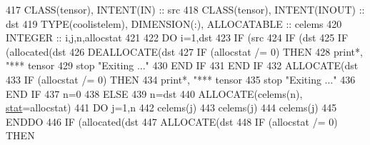 \begin{DoxyCode}
417     \textcolor{keywordtype}{CLASS}(tensor), \textcolor{keywordtype}{INTENT(IN)} :: src
418     \textcolor{keywordtype}{CLASS}(tensor), \textcolor{keywordtype}{INTENT(INOUT)} :: dst
419     \textcolor{keywordtype}{TYPE}(coolistelem), \textcolor{keywordtype}{DIMENSION(:)}, \textcolor{keywordtype}{ALLOCATABLE} :: celems
420     \textcolor{keywordtype}{INTEGER} :: i,j,n,allocstat
421 
422     \textcolor{keywordflow}{DO} i=1,dst%
423        \textcolor{keywordflow}{IF} (src%
424           \textcolor{keywordflow}{IF} (dst%
425              \textcolor{keywordflow}{IF} (\textcolor{keyword}{allocated}(dst%
426                 \textcolor{keyword}{DEALLOCATE}(dst%
427                 \textcolor{keywordflow}{IF} (allocstat /= 0) \textcolor{keywordflow}{THEN}
428                   print*, \textcolor{stringliteral}{"*** tensor%
429                   stop \textcolor{stringliteral}{"Exiting ..."}
430 \textcolor{keywordflow}{                END IF}
431 \textcolor{keywordflow}{             END IF}
432              \textcolor{keyword}{ALLOCATE}(dst%
433              \textcolor{keywordflow}{IF} (allocstat /= 0) \textcolor{keywordflow}{THEN}
434                   print*, \textcolor{stringliteral}{"*** tensor%
435                   stop \textcolor{stringliteral}{"Exiting ..."}
436 \textcolor{keywordflow}{             END IF}
437              n=0
438           \textcolor{keywordflow}{ELSE}
439              n=dst%
440              \textcolor{keyword}{ALLOCATE}(celems(n), \hyperlink{namespacestat}{stat}=allocstat)
441              \textcolor{keywordflow}{DO} j=1,n
442                 celems(j)%
443                 celems(j)%
444                 celems(j)%
445 \textcolor{keywordflow}{             ENDDO}
446              \textcolor{keywordflow}{IF} (\textcolor{keyword}{allocated}(dst%
447              \textcolor{keyword}{ALLOCATE}(dst%
448              \textcolor{keywordflow}{IF} (allocstat /= 0) \textcolor{keywordflow}{THEN}
}}
\end{DoxyCode}
